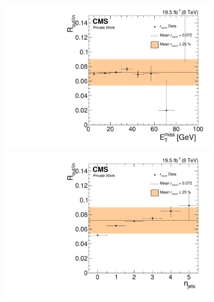\begin{figure}[htbp]
\centering
\begin{minipage}[t]{0.49\textwidth}
  \includegraphics[width=\textwidth]{plots/BG/rOutIn/rOutInSyst_DrellYanControlCentral_Full2012_MET_LowMass_SF_None.pdf}
\end{minipage}
\begin{minipage}[t]{0.49\textwidth}
\includegraphics[width=\textwidth]{plots/BG/rOutIn/rOutInSyst_DrellYanControlCentral_Full2012_NJets_LowMass_SF_None.pdf}
\end{minipage}
\begin{minipage}[t]{0.49\textwidth}

\end{minipage}
\end{figure}
